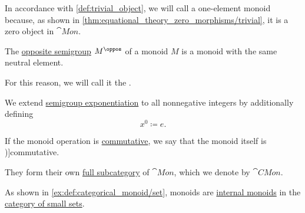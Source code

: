 \begin{definition}
\begin{thmenum}
     In accordance with \cref{def:trivial_object}, we will call a one-element monoid  because, as shown in \cref{thm:equational_theory_zero_morphisms/trivial}, it is a zero object in \( \cat{Mon} \).

    \mimprovised The \hyperref[def:semigroup/opposite]{opposite semigroup} \( M^\oppos \) of a monoid \( M \) is a monoid with the same neutral element.

    For this reason, we will call it the .

     We extend \hyperref[def:semigroup/exponentiation]{semigroup exponentiation} to all nonnegative integers by additionally defining
    \begin{equation*}
      x^0 \coloneqq e.
    \end{equation*}

    \mimprovised If the monoid operation is \hyperref[def:binary_operation/commutative]{commutative}, we say that the monoid itself is \term[en=commutative monoid (\cite[41]{Jacobson1985BasicAlgebraI})]{commutative}.

    They form their own \hyperref[def:subcategory/full]{full subcategory} of \( \cat{Mon} \), which we denote by \( \cat{CMon} \).
  \end{thmenum}
\end{definition}
\begin{comments}
  \item As shown in \cref{ex:def:categorical_monoid/set}, monoids are \hyperref[def:categorical_monoid]{internal monoids} in the \hyperref[def:category_of_small_sets]{category of small sets}.
\end{comments}

